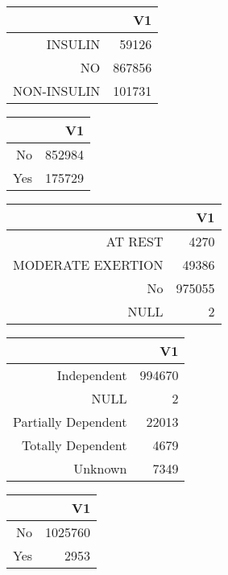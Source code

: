 \bigskip\bigskip
\centering
\begin{tabular}{rr}
  \hline
 & V1 \\ 
  \hline
INSULIN & 59126 \\ 
  NO & 867856 \\ 
  NON-INSULIN & 101731 \\ 
   \hline
\end{tabular}

\bigskip\bigskip
\centering
\begin{tabular}{rr}
  \hline
 & V1 \\ 
  \hline
No & 852984 \\ 
  Yes & 175729 \\ 
   \hline
\end{tabular}

\bigskip\bigskip
\centering
\begin{tabular}{rr}
  \hline
 & V1 \\ 
  \hline
AT REST & 4270 \\ 
  MODERATE EXERTION & 49386 \\ 
  No & 975055 \\ 
  NULL &   2 \\ 
   \hline
\end{tabular}

\bigskip\bigskip
\centering
\begin{tabular}{rr}
  \hline
 & V1 \\ 
  \hline
Independent & 994670 \\ 
  NULL &   2 \\ 
  Partially Dependent & 22013 \\ 
  Totally Dependent & 4679 \\ 
  Unknown & 7349 \\ 
   \hline
\end{tabular}

\bigskip\bigskip
\centering
\begin{tabular}{rr}
  \hline
 & V1 \\ 
  \hline
No & 1025760 \\ 
  Yes & 2953 \\ 
   \hline
\end{tabular}

